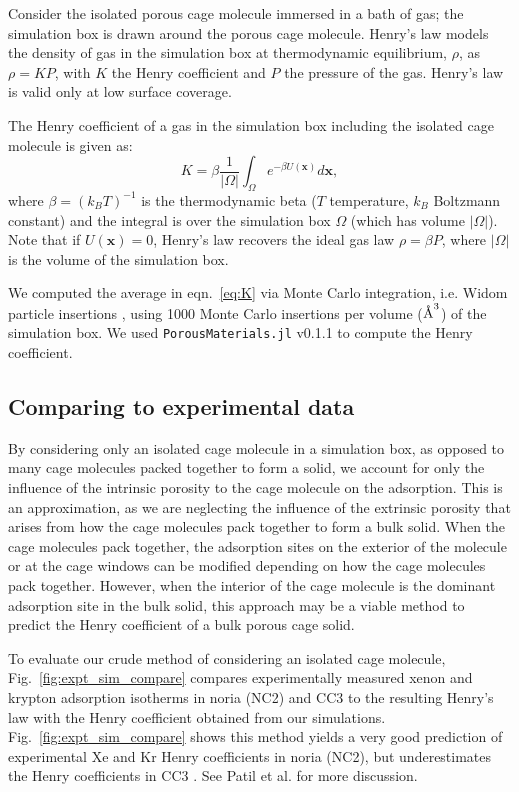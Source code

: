 \documentclass[journal=jacsat,manuscript=article]{achemso}
\newcommand{\angstrom}{\mbox{\normalfont\AA}}
\begin{document}
Consider the isolated porous cage molecule immersed in a bath of gas; the simulation box is drawn around the porous cage molecule. Henry's law models the density of gas in the simulation box at thermodynamic equilibrium, $\rho $, as $\rho=K P$, with $K$ the Henry coefficient and $P$ the pressure of the gas. Henry's law is valid only at low surface coverage.

The Henry coefficient of a gas in the simulation box including the isolated cage molecule is given as:
\begin{equation}
K = \beta \frac{1}{|\Omega|} \int_\Omega e^{-\beta U(\mathbf{x})} d\mathbf{x},
\label{eq:K}
\end{equation} where $\beta= (k_B T)^{-1}$ is the thermodynamic beta ($T$ temperature, $k_B$ Boltzmann constant) and the integral is over the simulation box $\Omega$ (which has volume $|\Omega|$). Note that if $U(\mathbf{x})=0$, Henry's law recovers the ideal gas law $\rho = \beta P$, where $|\Omega|$ is the volume of the simulation box.

We computed the average in eqn.~\ref{eq:K} via Monte Carlo integration, i.e. Widom particle insertions \cite{frenkel2001understanding}, using 1000 Monte Carlo insertions per volume ($\angstrom^3$) of the simulation box. We used \texttt{PorousMaterials.jl} v0.1.1 \cite{PorousMaterialsJL} to compute the Henry coefficient.

\subsection{Comparing to experimental data}
By considering only an isolated cage molecule in a simulation box, as opposed to many cage molecules packed together to form a solid, we account for only the influence of the intrinsic porosity to the cage molecule on the adsorption. This is an approximation, as we are neglecting the influence of the extrinsic porosity that arises from how the cage molecules pack together to form a bulk solid. When the cage molecules pack together, the adsorption sites on the exterior of the molecule or at the cage windows can be modified depending on how the cage molecules pack together. However, when the interior of the cage molecule is the dominant adsorption site in the bulk solid, this approach may be a viable method to predict the Henry coefficient of a bulk porous cage solid.

To evaluate our crude method of considering an isolated cage molecule, Fig.~\ref{fig:expt_sim_compare} compares experimentally measured xenon and krypton adsorption isotherms in noria \cite{patil2016noria} (NC2) and CC3 \cite{chen2014separation} to the resulting Henry's law with the Henry coefficient obtained from our simulations. Fig.~\ref{fig:expt_sim_compare} shows this method yields a very good prediction of experimental Xe and Kr Henry coefficients in noria \cite{patil2016noria} (NC2), but underestimates the Henry coefficients in CC3 \cite{chen2014separation}. See Patil et al. \cite{patil2016noria} for more discussion.
\end{document}
